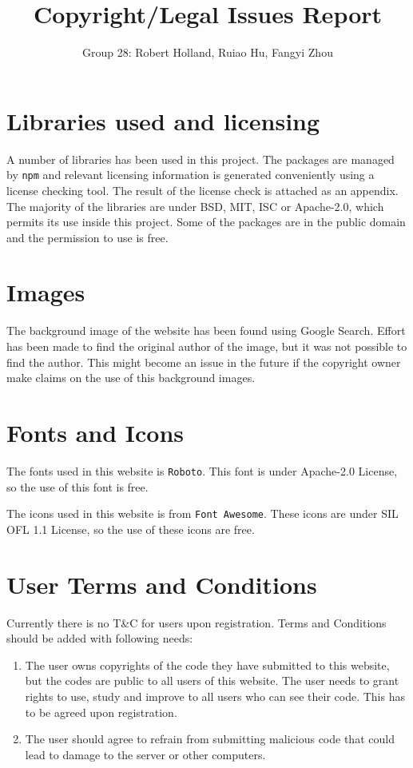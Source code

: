 \documentclass[a4paper]{article}
\title{Copyright/Legal Issues Report}
\author{Group 28: Robert Holland, Ruiao Hu, Fangyi Zhou}
\begin{document}
\maketitle

\section{Libraries used and licensing}

A number of libraries has been used in this project. The packages are
managed by \texttt{npm} and relevant licensing information is generated
conveniently using a license checking tool. The result of the license check
is attached as an appendix. The majority of the libraries are under BSD, MIT,
ISC or Apache-2.0, which permits its use inside this project. Some of the
packages are in the public domain and the permission to use is free.

\section{Images}

The background image of the website has been found using Google Search. Effort
has been made to find the original author of the image, but it was not possible
to find the author. This might become an issue in the future if the copyright
owner make claims on the use of this background images.

\section{Fonts and Icons}

The fonts used in this website is \texttt{Roboto}. This font is under
Apache-2.0 License, so the use of this font is free.

The icons used in this website is from \texttt{Font Awesome}. These icons are
under SIL OFL 1.1 License, so the use of these icons are free.

\section{User Terms and Conditions}

Currently there is no T\&C for users upon registration. Terms and Conditions
should be added with following needs:
\begin{enumerate}
\item
The user owns copyrights of the code they have submitted to this website, but
the codes are public to all users of this website. The user needs to grant
rights to use, study and improve to all users who can see their code. This has
to be agreed upon registration.
\item
The user should agree to refrain from submitting malicious code that could
lead to damage to the server or other computers.
\end{enumerate}
\end{document}
